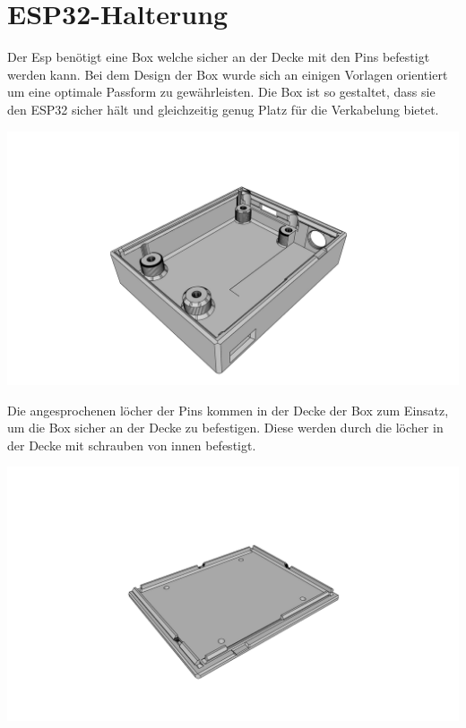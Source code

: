 \section{ESP32-Halterung}
Der Esp benötigt eine Box welche sicher an der Decke mit den Pins befestigt werden kann.
Bei dem Design der Box wurde sich an einigen Vorlagen orientiert um eine optimale Passform zu gewährleisten.
Die Box ist so gestaltet, dass sie den ESP32 sicher hält und gleichzeitig genug Platz für die Verkabelung bietet.

\begin{center}
  \includegraphics[width=1\textwidth]{../images/3DPrinting/ESPCaseBot.png}
\end{center}

Die angesprochenen löcher der Pins kommen in der Decke der Box zum Einsatz, um die Box sicher an der Decke zu befestigen.
Diese werden durch die löcher in der Decke mit schrauben von innen befestigt.

\begin{center}
  \includegraphics[width=1\textwidth]{../images/3DPrinting/ESPCaseTop.png}
\end{center}

